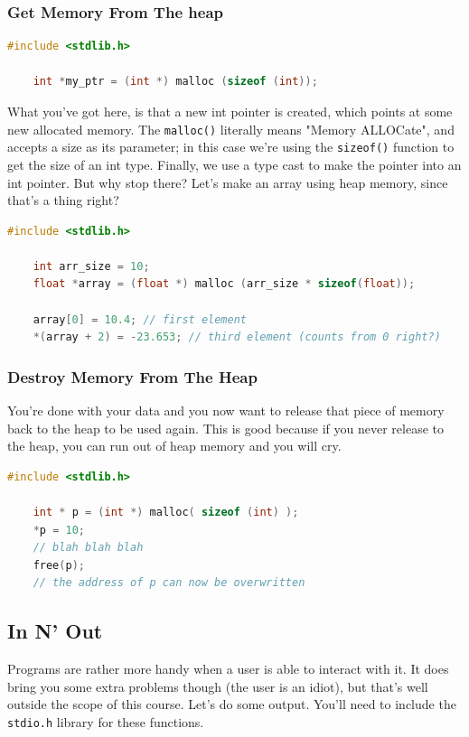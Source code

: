\subsubsection{Get Memory From The heap}
\begin{lstlisting}[language=C]
    #include <stdlib.h>

    int *my_ptr = (int *) malloc (sizeof (int));
\end{lstlisting}
What you've got here, is that a new int pointer is created, which points at some new allocated memory. The \texttt{malloc()} literally means "Memory ALLOCate", and accepts a size as its parameter; in this case we're using the \texttt{sizeof()} function to get the size of an int type. Finally, we use a type cast to make the pointer into an int pointer. But why stop there? Let's make an array using heap memory, since that's a thing right?
\begin{lstlisting}[language=C]
    #include <stdlib.h>

    int arr_size = 10;
    float *array = (float *) malloc (arr_size * sizeof(float));

    array[0] = 10.4; // first element
    *(array + 2) = -23.653; // third element (counts from 0 right?)
\end{lstlisting}

\subsubsection{Destroy Memory From The Heap}
You're done with your data and you now want to release that piece of memory back to the heap to be used again. This is good because if you never release to the heap, you can run out of heap memory and you will cry.
\begin{lstlisting}[language=C]
    #include <stdlib.h>

    int * p = (int *) malloc( sizeof (int) );
    *p = 10;
    // blah blah blah
    free(p);
    // the address of p can now be overwritten
\end{lstlisting}

\subsection{In N' Out}
Programs are rather more handy when a user is able to interact with it. It does bring you some extra problems though (the user is an idiot), but that's well outside the scope of this course. Let's do some output. You'll need to include the \texttt{stdio.h} library for these functions.

